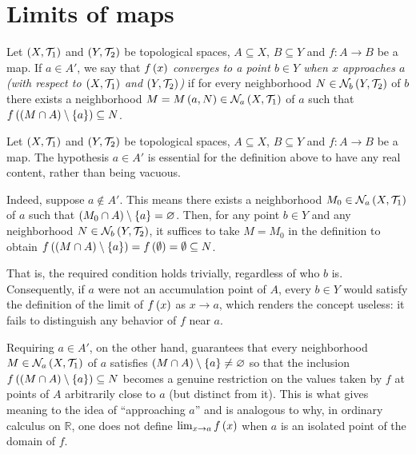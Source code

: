 \section{Limits of maps}

\begin{definition}
  Let $\left(X,\mathcal{T}_1\right)$ and $\left(Y,\mathcal{T}_2\right)$ be topological spaces, $A\subseteq X$, $B\subseteq Y$ and $f:A\rightarrow B$ be a map. If $a\in A'$, we say that \textit{$f\left(x\right)$ converges to a point $b\in Y$ when $x$ approaches $a$ (with respect to $\left(X,\mathcal{T}_1\right)$ and $\left(Y,\mathcal{T}_2\right)$)} if for every neighborhood $N\in\mathcal{N}_b\left(Y,\mathcal{T}_2\right)$ of $b$ there exists a neighborhood $M=M\left(a,N\right)\in\mathcal{N}_a\left(X,\mathcal{T}_1\right)$ of $a$ such that $f\left(\left(M\cap A\right)\setminus\left\{a\right\}\right)\subseteq N$.
\end{definition}

\begin{remark}
  Let $\left(X,\mathcal{T}_1\right)$ and $\left(Y,\mathcal{T}_2\right)$ be topological spaces, $A\subseteq X$, $B\subseteq Y$ and $f:A\rightarrow B$ be a map. The hypothesis $a\in A'$ is essential for the definition above to have any real content, rather than being vacuous.

  Indeed, suppose $a\notin A'$. This means there exists a neighborhood $M_0\in\mathcal{N}_a\left(X,\mathcal{T}_1\right)$ of $a$ such that $\left(M_0\cap A\right)\setminus\left\{a\right\}=\varnothing$. Then, for any point $b\in Y$ and any neighborhood $N\in\mathcal{N}_b\left(Y,\mathcal{T}_2\right)$, it suffices to take $M=M_0$ in the definition to obtain $f\left(\left(M\cap A\right)\setminus\left\{a\right\}\right)=f\left(\emptyset\right)=\emptyset\subseteq N$.

  That is, the required condition holds trivially, regardless of who $b$ is. Consequently, if $a$ were not an accumulation point of $A$, every $b\in Y$ would satisfy the definition of the limit of $f\left(x\right)$ as $x\to a$, which renders the concept useless: it fails to distinguish any behavior of $f$ near $a$.

  Requiring $a\in A'$, on the other hand, guarantees that every neighborhood $M\in\mathcal{N}_a\left(X,\mathcal{T}_1\right)$ of $a$ satisfies $\left(M\cap A\right)\setminus\left\{a\right\}\neq\varnothing$ so that the inclusion $f\left(\left(M\cap A\right)\setminus\left\{a\right\}\right)\subseteq N$ becomes a genuine restriction on the values taken by $f$ at points of $A$ arbitrarily close to $a$ (but distinct from it). This is what gives meaning to the idea of ``approaching $a$'' and is analogous to why, in ordinary calculus on $\mathbb{R}$, one does not define $\lim_{x\to a}f\left(x\right)$ when $a$ is an isolated point of the domain of $f$.
\end{remark}

